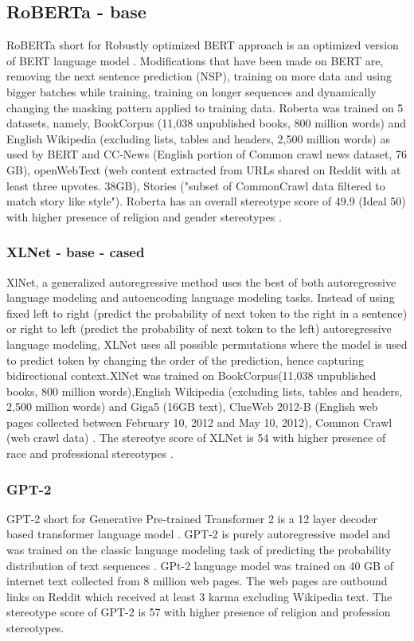 \subsection{RoBERTa - base}
RoBERTa short for Robustly optimized BERT approach is an optimized version of BERT language model \cite{liu2019roberta}. Modifications that have been made on BERT are, removing the next sentence prediction (NSP), training on more data and using bigger batches while training, training on longer sequences and dynamically changing the masking pattern applied to training data\cite{liu2019roberta}.  Roberta was trained on 5 datasets, namely, BookCorpus (11,038 unpublished books, 800 million words) and English Wikipedia (excluding lists, tables and headers, 2,500 million words) as used by BERT and CC-News (English portion of Common crawl news dataset, 76 GB), openWebText (web content extracted from URLs shared on Reddit with at least three upvotes. 38GB), Stories ("subset of CommonCrawl data filtered to match story like style")\cite{liu2019roberta}. Roberta has an overall stereotype score of 49.9 (Ideal 50) with higher presence of religion and gender stereotypes \cite{nadeem2020stereoset}.  

\subsubsection{XLNet - base - cased }
XlNet, a generalized autoregressive method uses the best of both autoregressive language modeling and autoencoding language modeling tasks. Instead of using fixed left to right (predict the probability of next token to the right in a sentence) or right to left (predict the probability of next token to the left) autoregressive language modeling, XLNet uses all possible permutations where the model is used to predict token by changing the order of the prediction, hence capturing bidirectional context\cite{yang2019xlnet}.XlNet was trained on BookCorpus(11,038 unpublished books, 800 million words),English Wikipedia (excluding lists, tables and headers, 2,500 million words) and  Giga5 (16GB text), ClueWeb 2012-B (English web pages collected between February 10, 2012 and May 10, 2012), Common Crawl (web crawl data) \cite{yang2019xlnet}. The stereotye score of XLNet is 54 with higher presence of race and professional stereotypes \cite{nadeem2020stereoset}.
\subsubsection{GPT-2}
GPT-2 short for Generative Pre-trained Transformer 2 is a 12 layer decoder based transformer language model \cite{radford2019language}. GPT-2 is purely autoregressive model and was trained on the classic language modeling task of predicting the probability distribution of text sequences \cite{radford2019language}. GPt-2 language model was trained on 40 GB of internet text collected from 8 million web pages. The web pages are outbound links on Reddit which received at least 3 karma excluding Wikipedia text. The stereotype score of GPT-2 is 57 with higher presence of religion and profession stereotypes. 

